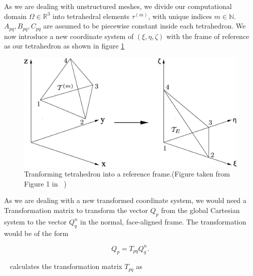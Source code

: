 As we are dealing with unstructured meshes, we divide our computational domain $\Omega \in \mathbb{R}^3$ into tetrahedral elements 
$\tau^{\left(m\right)}$, with unique indices $m\in\mathbb{N}$. $A_{pq}, B_{pq}, C_{pq}$ are assumed to be piecewise constant
inside each tetrahedron. We now introduce a new coordinate system of $\left(\xi, \eta, \zeta \right)$ with the frame of reference as our tetrahedron as shown 
in figure \ref{fig:transformation} \\

\begin{figure}
    \centering
    \includegraphics[width=0.6\linewidth]{figures/m_167-1-319-fig001.png}
    \caption{Tranforming tetrahedron into a reference frame.(Figure taken from Figure 1 in ~\parencite{dumbser1})}
    \label{fig:transformation}
\end{figure}

As we are dealing with a new transformed coordinate system, we would need a Transformation matrix to transform the vector $Q_p$
from the global Cartesian system to the vector $Q_q^n$ in the normal, face-aligned frame. The transformation would be of the form

\begin{equation}
    Q_p = T_{pq}Q_q^n .
\end{equation}

~\parencite{dumbser1} calculates the transformation matrix $T_{pq}$ as

